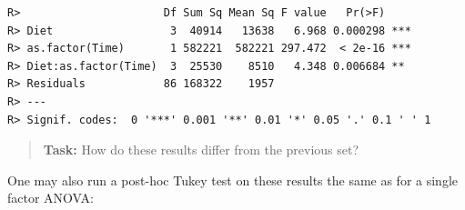 \documentclass[english,10pt,a4paper,oneside]{book}
\newenvironment{Shaded}{\begin{snugshade}}{\end{snugshade}}
\newcommand{\DataTypeTok}[1]{\textcolor[rgb]{0.13,0.29,0.53}{#1}}
\newcommand{\DecValTok}[1]{\textcolor[rgb]{0.00,0.00,0.81}{#1}}
\newcommand{\KeywordTok}[1]{\textcolor[rgb]{0.13,0.29,0.53}{\textbf{#1}}}
\newcommand{\NormalTok}[1]{#1}
\newcommand{\OperatorTok}[1]{\textcolor[rgb]{0.81,0.36,0.00}{\textbf{#1}}}
\newcommand{\StringTok}[1]{\textcolor[rgb]{0.31,0.60,0.02}{#1}}
\theoremstyle{definition}
\theoremstyle{definition}
\theoremstyle{definition}
\theoremstyle{remark}
\begin{document}
\begin{Shaded}
\end{Shaded}

\begin{verbatim}
R>                      Df Sum Sq Mean Sq F value   Pr(>F)    
R> Diet                  3  40914   13638   6.968 0.000298 ***
R> as.factor(Time)       1 582221  582221 297.472  < 2e-16 ***
R> Diet:as.factor(Time)  3  25530    8510   4.348 0.006684 ** 
R> Residuals            86 168322    1957                     
R> ---
R> Signif. codes:  0 '***' 0.001 '**' 0.01 '*' 0.05 '.' 0.1 ' ' 1
\end{verbatim}

\begin{quote}
\textbf{Task:} How do these results differ from the previous set?
\end{quote}

One may also run a post-hoc Tukey test on these results the same as for
a single factor ANOVA:

\begin{Shaded}
\end{Shaded}
\end{document}
